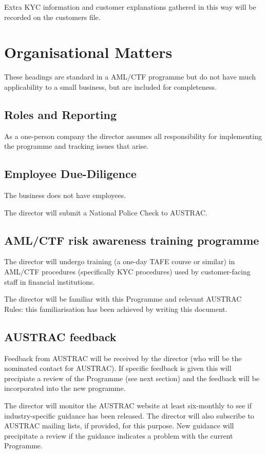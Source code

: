 \documentclass[12pt]{report}
\begin{document}
Extra KYC information and customer explanations gathered in this way will be recorded on the customers file.

\section{Organisational Matters}

These headings are standard in a AML/CTF programme but do not have much applicability to a small business, but are included for completeness.

\subsection{Roles and Reporting}

As a one-person company the director assumes all responsibility for implementing the programme and tracking issues that arise.

\subsection{Employee Due-Diligence}

The business does not have employees.

The director will submit a National Police Check to AUSTRAC.

\subsection{AML/CTF risk awareness training programme}

The director will undergo training (a one-day TAFE course
or similar) in AML/CTF procedures (specifically KYC procedures) used by customer-facing staff in financial institutions.

The director will be familiar with this Programme and relevant AUSTRAC Rules: this familiarisation has been achieved by writing this document. 

\subsection{AUSTRAC feedback}

Feedback from AUSTRAC will be received by the director (who will be the nominated contact for AUSTRAC). If specific feedback is given this
will precipiate a review of the Programme (see next section) and the feedback will be incorporated into the new programme.

The director will monitor the AUSTRAC website at least six-monthly to see if industry-specific guidance has been released.
The director will also subscribe to AUSTRAC mailing lists, if provided, for this purpose. New guidance 
will precipitate a review if the guidance indicates a problem with the current Programme.
\end{document}
